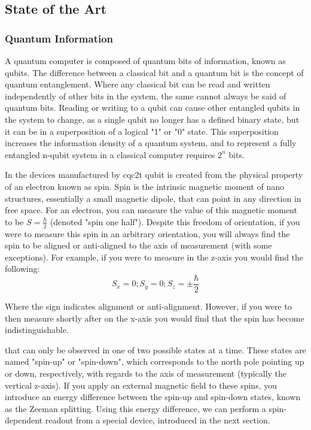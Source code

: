 \subsection{State of the Art}
\subsubsection{Quantum Information}
A quantum computer is composed of quantum bits of information, known as qubits. The difference between a classical bit and a quantum bit is the concept of quantum entanglement. Where any classical bit can be read and written independently of other bits in the system, the same cannot always be said of quantum bits. Reading or writing to a qubit can cause other entangled qubits in the system to change, as a single qubit no longer has a defined binary state, but it can be in a superposition of a logical "1" or "0" state. This superposition increases the information density of a quantum system, and to represent a fully entangled n-qubit system in a classical computer requires $2^n$ bits. \cite{bennett2000quantum}

In the devices manufactured by \gls{cqc2t} qubit is created from the physical property of an electron known as spin. Spin is the intrinsic magnetic moment of nano structures, essentially a small magnetic dipole, that can point in any direction in free space. For an electron, you can measure the value of this magnetic moment to be $S = \frac{\hbar}{2}$ (denoted "spin one half"). Despite this freedom of orientation, if you were to measure this spin in an arbitrary orientation, you will always find the spin to be aligned or anti-aligned to the axis of measurement (with some exceptions). For example, if you were to measure in the z-axis you would find the following:
$$S_x = 0; S_y = 0; S_z = \pm\frac{\hbar}{2}$$

Where the sign indicates alignment or anti-alignment.
However, if you were to then measure shortly after on the x-axis you would find that the spin has become indistinguishable.

that can only be observed in one of two possible states at a time. These states are named "spin-up" or "spin-down", which corresponds to the north pole pointing up or down, respectively, with regards to the axis of measurement (typically the vertical z-axis). 
\label{zeeman}
If you apply an external magnetic field to these spins, you introduce an energy difference between the spin-up and spin-down states, known as the Zeeman splitting. Using this energy difference, we can perform a spin-dependent readout from a special device, introduced in the next section.
